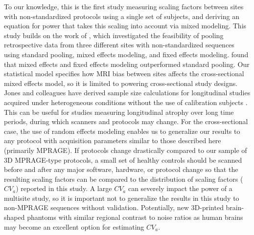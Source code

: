 \documentclass{article}
\begin{document}
To our knowledge, this is the first study measuring scaling factors between sites with non-standardized protocols using a single set of subjects, and deriving an equation for power that takes this scaling into account via mixed modeling. This study builds on the work of \cite{fennema2007feasibility}, which investigated the feasibility of pooling retrospective data from three different sites with non-standardized sequences using standard pooling, mixed effects modeling, and fixed effects modeling. \cite{fennema2007feasibility} found that mixed effects and fixed effects modeling outperformed standard pooling. Our statistical model specifies how MRI bias between sites affects the cross-sectional mixed effects model, so it is limited to powering cross-sectional study designs. Jones and colleagues have derived sample size calculations for longitudinal studies acquired under heterogeneous conditions without the use of calibration subjects \cite{jones2013quantification}. This can be useful for studies measuring longitudinal atrophy over long time periods, during which scanners and protocols may change. For the cross-sectional case, the use of random effects modeling enables us to generalize our results to any protocol with acquisition parameters similar to those described here (primarily MPRAGE). If protocols change drastically compared to our sample of 3D MPRAGE-type protocols, a small set of healthy controls should be scanned before and after any major software, hardware, or protocol change so that the resulting scaling factors can be compared to the distribution of scaling factors ($CV_a$) reported in this study. A large $CV_a$ can severely impact the power of a multisite study, so it is important not to generalize the results in this study to non-MPRAGE sequences without validation. Potentially, new 3D-printed brain-shaped phantoms with similar regional contrast to noise ratios as human brains may become an excellent option for estimating $CV_a$.
\end{document}
